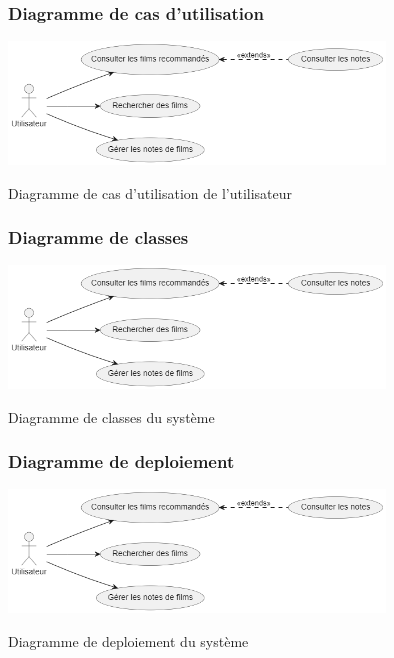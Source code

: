 \documentclass{beamer}
\begin{document}
\begin{frame}
    \frametitle{Diagramme de cas d'utilisation}
        \vspace{0.5cm}
    \begin{center}
        \includegraphics[width=0.75\textwidth]{uc_utilisateur.png}
        
        {\small Diagramme de cas d'utilisation de l'utilisateur}
    \end{center}
\end{frame}

\begin{frame}
    \frametitle{Diagramme de classes}
        \vspace{0.5cm}
    \begin{center}
        \includegraphics[width=0.75\textwidth]{uc_utilisateur.png}
        
        {\small Diagramme de classes du système}
    \end{center}
\end{frame}

\begin{frame}
    \frametitle{Diagramme de deploiement}
        \vspace{0.5cm}
    \begin{center}
        \includegraphics[width=0.75\textwidth]{uc_utilisateur.png}
        
        {\small Diagramme de deploiement du système}
    \end{center}
\end{frame}
\end{document}
